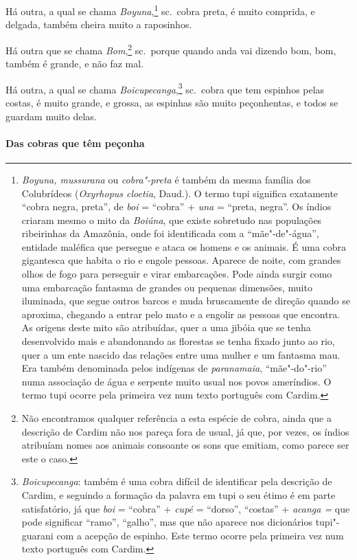  Há outra, a qual se chama \textit{Boyuna},\footnote{ \textit{Boyuna,
mussurana} ou \textit{cobra"-preta} é também da mesma família dos
Colubrídeos (\textit{Oxyrhopus cloetia}, Daud.). O termo tupi significa
exatamente ``cobra negra, preta'', de \textit{boi} = ``cobra'' +
\textit{una} = ``preta, negra''. Os índios criaram mesmo o mito da
\textit{Boiúna}, que existe sobretudo nas populações ribeirinhas da
Amazônia, onde foi identificada com a ``mãe"-de"-água'', entidade maléfica
que persegue e ataca os homens e os animais. É uma cobra gigantesca que
habita o rio e engole pessoas. Aparece de noite, com grandes olhos de
fogo para perseguir e virar embarcações. Pode ainda surgir como uma
embarcação fantasma de grandes ou pequenas dimensões, muito iluminada,
que segue outros barcos e muda bruscamente de direção quando se
aproxima, chegando a entrar pelo mato e a engolir as pessoas que
encontra. As origens deste mito são atribuídas, quer a uma jibóia que
se tenha desenvolvido mais e abandonando as florestas se tenha fixado
junto ao rio, quer a um ente nascido das relações entre uma mulher e um
fantasma mau. Era também denominada pelos indígenas de
\textit{paranamaia}, ``mãe"-do"-rio'' numa associação de água e serpente
muito usual nos povos ameríndios. O termo tupi ocorre pela primeira vez
num texto português com Cardim.} sc.~cobra preta, é muito comprida, e
delgada, também cheira muito a raposinhos.

 Há outra que se chama \textit{Bom},\footnote{ Não encontramos qualquer
referência a esta espécie de cobra, ainda que a descrição de Cardim não
nos pareça fora de usual, já que, por vezes, os índios atribuíam nomes
aos animais consoante os sons que emitiam, como parece ser este o caso.}
sc.~porque quando anda vai dizendo bom, bom, também é grande, e não faz mal.

 Há outra, a qual se chama \textit{Boicupecanga},\footnote{ \textit{
Boicupecanga}: também é uma cobra difícil de identificar pela
descrição de Cardim, e seguindo a formação da palavra em tupi o seu
étimo é em parte satisfatório, já que \textit{boi} = ``cobra'' +
\textit{cupé} = ``dorso'', ``costas'' + \textit{acanga =} que pode
significar ``ramo'', ``galho'', mas que não aparece nos dicionários 
tupi"-guarani com a acepção de espinho. Este termo ocorre pela primeira
vez num texto português com Cardim.} sc.~cobra que tem espinhos pelas
costas, é muito grande, e grossa, as espinhas são muito peçonhentas, e
todos se guardam muito delas.

\paragraph{Das cobras que têm peçonha}

